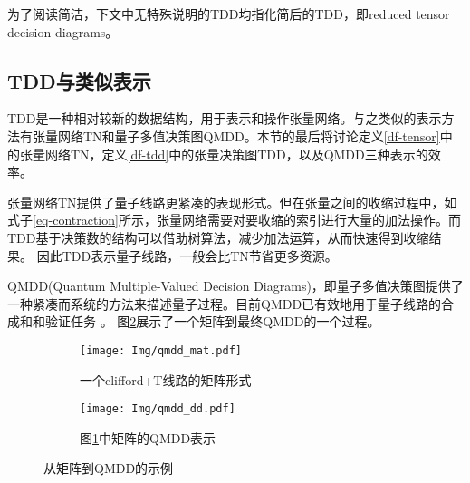 为了阅读简洁，下文中无特殊说明的TDD均指化简后的TDD，即reduced tensor decision diagrams。


\subsection{TDD与类似表示}
\label{sec-compare}
TDD是一种相对较新的数据结构，用于表示和操作张量网络。与之类似的表示方法有张量网络TN和量子多值决策图QMDD。本节的最后将讨论定义\ref{df-tensor}中的张量网络TN，定义\ref{df-tdd}中的张量决策图TDD，以及QMDD\citep{1623982}三种表示的效率。

张量网络TN提供了量子线路更紧凑的表现形式。但在张量之间的收缩过程中，如式子\ref{eq-contraction}所示，张量网络需要对要收缩的索引进行大量的加法操作。而TDD基于决策数的结构可以借助树算法，减少加法运算，从而快速得到收缩结果。
因此TDD表示量子线路，一般会比TN节省更多资源。

QMDD(Quantum Multiple-Valued Decision Diagrams)，即量子多值决策图提供了一种紧凑而系统的方法来描述量子过程。目前QMDD已有效地用于量子线路的合成\citep{niemann2020advanced}和和验证任务
\citep{burgholzer2020verifying,burgholzer2020advanced}。
图\ref{fig:qmdd-basic}展示了一个矩阵到最终QMDD的一个过程。
\begin{figure}[htbp]
    \centering
    \begin{subfigure}[b]{.45\textwidth}
        \centering
        \texttt{[image: Img/qmdd\_mat.pdf]}
        \caption{一个clifford+T线路的矩阵形式}
        \label{fig:qmdd_mat}
    \end{subfigure}
    \qquad
    \begin{subfigure}[b]{.45\textwidth}
        \centering
        \texttt{[image: Img/qmdd\_dd.pdf]}
        \caption{图\ref{fig:qmdd_mat}中矩阵的QMDD表示}
    \end{subfigure}
    \caption{从矩阵到QMDD的示例\citep{niemann2020advanced}}
    \label{fig:qmdd-basic}
\end{figure}

